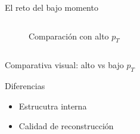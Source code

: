 \documentclass[aspectratio=169]{beamer}
\begin{document}
\begin{frame}{El reto del bajo momento}
\begin{columns}
\begin{column}{0.48\textwidth}
\begin{figure}
        \caption{\small Comparación con alto \texorpdfstring{$p_T$}{pT}}
      \end{figure}
    \end{column}
  \end{columns}
\end{frame}

\begin{frame}{Comparativa visual: alto vs bajo \texorpdfstring{$p_T$}{pT}}
  \vspace{-0.5em}
  \begin{block}{Diferencias}
    \begin{itemize}
      \item Estrucutra interna
      \item Calidad de reconstrucción
    \end{itemize}
  \end{block}
  

\end{frame}
\end{document}
